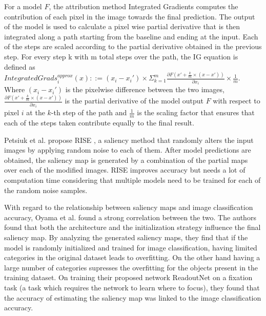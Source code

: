 For a model $F$, the attribution method Integrated Gradients \cite{sundararajanAxiomaticAttributionDeep2017} computes the contribution of each pixel in the image towards the final prediction. The output of the model is used to calculate a pixel wise partial derivative that is then integrated along a path starting from the baseline and ending at the input. Each of the steps are scaled according to the partial derivative obtained in the previous step. For every step k with m total steps over the path, the IG equation is defined as $IntegratedGrads_i^{approx}(x)::=(x_{i}-x_i')\times \Sigma_{k=1}^{m}\frac{\partial F(x' + \frac{k}{m} \times (x-x'))}{\partial x_{i}} \times \frac{1}{m}$. Where $(x_{i} - x_{i}')$ is the pixelwise difference between the two images, $\frac{\partial F(x' + \frac{k}{m} \times (x-x'))}{\partial x_i}$ is the partial derivative of the model output $F$ with respect to pixel $i$ at the $k$-th step of the path and $\frac{1}{m}$ is the scaling factor that ensures that each of the steps taken contribute equally to the final result.

Petsiuk et al. propose RISE \cite{petsiukRISERandomizedInput2018}, a saliency method that randomly alters the input images by applying random noise to each of them. After model predictions are obtained, the saliency map is generated by a combination of the partial maps over each of the modified images. RISE improves accuracy but needs a lot of computation time considering that multiple models need to be trained for each of the random noise samples.

With regard to the relationship between saliency maps and image classification accuracy, Oyama et al. \cite{oyamaInfluenceImageClassification2018} found a strong correlation between the two. The authors found that both the architecture and the initialization strategy influence the final saliency map. By analyzing the generated saliency maps, they find that if the model is randomly initialized and trained for image classification, having limited categories in the original dataset leads to overfitting. On the other hand having a large number of categories supresses the overfitting for the objects present in the training dataset. On training their proposed network ReadoutNet on a fixation task (a task which requires the network to learn where to focus), they found that the accuracy of estimating the saliency map was linked to the image classification accuracy.

